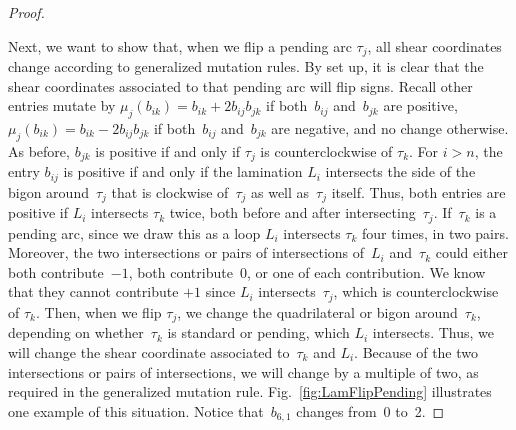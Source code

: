 \documentclass[11pt]{article}
\numberwithin{equation}{section}
\begin{document}
\begin{proof}
\begin{center}
\end{center}

Next, we want to show that, when we flip a pending arc $\tau_j$, all shear coordinates change according to generalized mutation rules. By set up, it is clear that the shear coordinates associated to that pending arc will flip signs. Recall other entries mutate by $\mu_j(b_{ik}) = b_{ik} + 2 b_{ij} b_{jk}$ if both~$b_{ij}$ and~$b_{jk}$ are positive, $\mu_j(b_{ik}) = b_{ik} - 2 b_{ij} b_{jk}$ if both~$b_{ij}$ and~$b_{jk}$ are negative, and no change otherwise. As before, $b_{jk}$ is positive if and only if $\tau_j$ is counterclockwise of $\tau_k$. For $i > n$, the entry $b_{ij}$ is positive if and only if the lamination $L_i$ intersects the side of the bigon around~$\tau_j$ that is clockwise of~$\tau_j$ as well as~$\tau_j$ itself. Thus, both entries are positive if $L_i$ intersects $\tau_k$ twice, both before and after intersecting~$\tau_j$. If~$\tau_k$ is a pending arc, since we draw this as a loop $L_i$ intersects $\tau_k$ four times, in two pairs. Moreover, the two intersections or pairs of intersections of~$L_i$ and~$\tau_k$ could either both contribute~$-1$, both contribute~0, or one of each contribution. We know that they cannot contribute $+1$ since $L_i$ intersects~$\tau_j$, which is counterclockwise of $\tau_k$. Then, when we flip $\tau_j$, we change the quadrilateral or bigon around~$\tau_k$, depending on whether~$\tau_k$ is standard or pending, which $L_i$ intersects. Thus, we will change the shear coordinate associated to~$\tau_k$ and $L_i$. Because of the two intersections or pairs of intersections, we will change by a multiple of two, as required in the generalized mutation rule.
Fig.~\ref{fig:LamFlipPending} illustrates one example of this situation. Notice that~$b_{6,1}$ changes from~0 to~2.
\end{proof}
\end{document}
